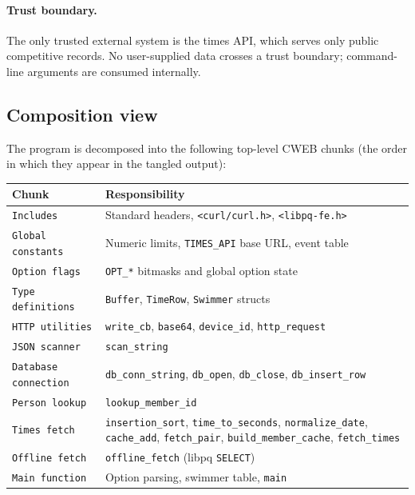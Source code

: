 \documentclass[12pt]{article}
\newcommand{\code}[1]{\texttt{#1}}
\begin{document}
\paragraph{Trust boundary.}
The only trusted external system is the times API, which
serves only public competitive records.  No user-supplied data
crosses a trust boundary; command-line arguments are consumed
internally.

\subsection{Composition view}

The program is decomposed into the following top-level CWEB
chunks (the order in which they appear in the tangled output):

\begin{center}
\begin{longtable}{ll}
  \toprule
  \textbf{Chunk} & \textbf{Responsibility} \\
  \midrule\endhead
  \code{Includes}                 & Standard headers, \code{<curl/curl.h>}, \code{<libpq-fe.h>} \\
  \code{Global constants}         & Numeric limits, \code{TIMES\_API} base URL, event table \\
  \code{Option flags}             & \code{OPT\_*} bitmasks and global option state \\
  \code{Type definitions}         & \code{Buffer}, \code{TimeRow}, \code{Swimmer}
                                    structs                                          \\
  \code{HTTP utilities}           & \code{write\_cb}, \code{base64}, \code{device\_id}, \code{http\_request} \\
  \code{JSON scanner}             & \code{scan\_string}                            \\
  \code{Database connection}      & \code{db\_conn\_string}, \code{db\_open},
                                    \code{db\_close}, \code{db\_insert\_row}        \\
  \code{Person lookup}            & \code{lookup\_member\_id}                      \\
  \code{Times fetch}              & \code{insertion\_sort}, \code{time\_to\_seconds},
                                    \code{normalize\_date}, \code{cache\_add},
                                    \code{fetch\_pair}, \code{build\_member\_cache},
                                    \code{fetch\_times}                            \\
  \code{Offline fetch}            & \code{offline\_fetch} (libpq \code{SELECT})    \\
  \code{Main function}            & Option parsing, swimmer table, \code{main}     \\
  \bottomrule
\end{longtable}
\end{center}
\end{document}
